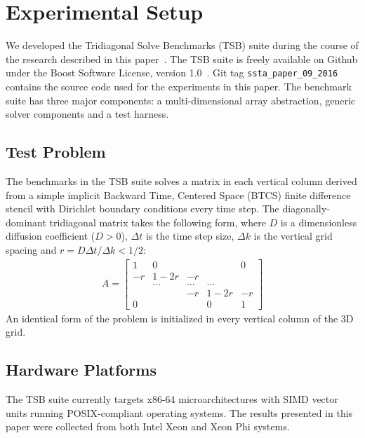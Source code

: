 \documentclass[10pt, conference, compsocconf]{IEEEtran}
\begin{document}
\section{Experimental Setup}
\label{sec:setup}
We developed the Tridiagonal Solve Benchmarks (TSB) suite during the course of
  the research described in this paper~\cite{tsb_git}.
The TSB suite is freely available on Github under the Boost Software License,
  version 1.0~\cite{boost_license}.
Git tag \lstinline{ssta_paper_09_2016} contains the source code used for the
  experiments in this paper.
The benchmark suite has three major components: a multi-dimensional array
  abstraction, generic solver components and a test harness.

\subsection{Test Problem}
\label{sec:setup:test_problem}

The benchmarks in the TSB suite solves a matrix in each vertical column derived
  from a simple implicit Backward Time, Centered Space (BTCS) finite difference
  stencil with Dirichlet boundary conditions every time step.
The diagonally-dominant tridiagonal matrix takes the following form,
  where \(D\) is a dimensionless diffusion coefficient (\(D > 0\)), \(\Delta t\)
  is the time step size, \(\Delta k\) is the vertical grid spacing and
  \(r=D \Delta t / \Delta k < 1/2\):
\begin{align*}
A = 
\begin{bmatrix}
1   & 0      &     &        & 0  \\
-r  & 1 - 2r & -r  &        &    \\
    & ...    & ... & ...    &    \\
    &        & -r  & 1 - 2r & -r \\
0   &        &     & 0      & 1
\end{bmatrix}  
\end{align*}
An identical form of the problem is initialized in every vertical column of the
  3D grid.

\subsection{Hardware Platforms}
\label{sec:setup:hardware_platforms}

The TSB suite currently targets x86-64 microarchitectures with SIMD vector units
  running POSIX-compliant operating systems.
The results presented in this paper were collected from both Intel Xeon and
  Xeon Phi systems.
\end{document}
